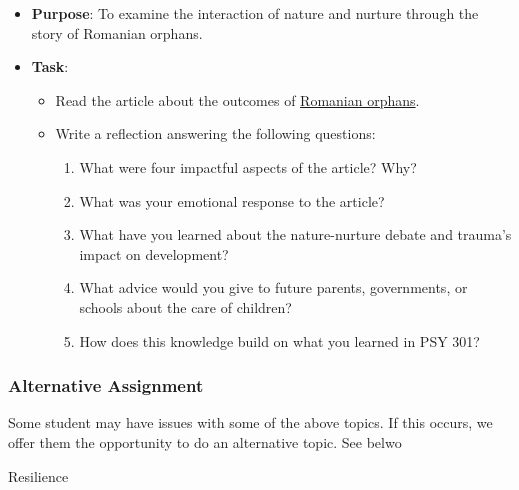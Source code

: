 \documentclass[
]{article}
\providecommand{\tightlist}{%
  \setlength{\itemsep}{0pt}\setlength{\parskip}{0pt}}
\begin{document}
\begin{itemize}
\tightlist
\item
  \textbf{Purpose}: To examine the interaction of nature and nurture through the story of Romanian orphans.\\
\item
  \textbf{Task}:

  \begin{itemize}
  \tightlist
  \item
    Read the article about the outcomes of \href{https://www.theatlantic.com/magazine/archive/2020/07/can-an-unloved-child-learn-to-love/612253/}{Romanian orphans}.\\
  \item
    Write a reflection answering the following questions:

    \begin{enumerate}
    \def\labelenumi{\arabic{enumi}.}
    \tightlist
    \item
      What were four impactful aspects of the article? Why?\\
    \item
      What was your emotional response to the article?\\
    \item
      What have you learned about the nature-nurture debate and trauma's impact on development?\\
    \item
      What advice would you give to future parents, governments, or schools about the care of children?\\
    \item
      How does this knowledge build on what you learned in PSY 301?
    \end{enumerate}
  \end{itemize}
\end{itemize}

\hypertarget{alternative-assignment}{%
\subsubsection{Alternative Assignment}\label{alternative-assignment}}

Some student may have issues with some of the above topics. If this occurs, we offer them the opportunity to do an alternative topic. See belwo

Resilience
\end{document}
